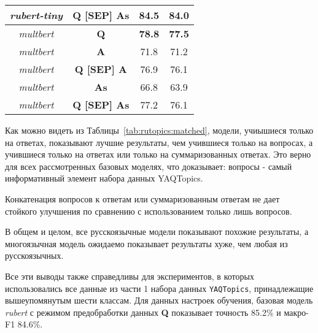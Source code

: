 \begin{table*}
{\begin{tabular}{|c|c||c|c|}
\textit{rubert-tiny} &  \textbf{Q [SEP] As} & \textbf{84.5} & \textbf{84.0}\\ \hline \hline%
\textit{multbert} &  \textbf{Q} & \textbf{78.8} & \textbf{77.5}\\ \hline%
\textit{multbert} &  \textbf{A} & 71.8 & 71.2\\ \hline%
\textit{multbert} &  \textbf{Q [SEP] A} & 76.9 & 76.1\\ \hline%
\textit{multbert} &  \textbf{As} & 66.8 & 63.9\\ \hline%
\textit{multbert} &  \textbf{Q [SEP] As} & 77.2 & 76.1\\ \hline%
\end{tabular}
}
\caption{
 Точность (макро-F1) различных типов базовых моделей на объединенных тестовых данных \texttt{MASSIVE} для русского языка.
Модели были обучены на шестиклассовой \textbf{равноразмерной} подвыборке \texttt{YAQTopics}, предобработанной при помощи одного из нескольких режимов, описанных в Разделе~\ref{rutopics:prepr}. Условные обозначения моделей - как в  Таблице~\ref{tab:rutopics:backbones}. Усреднено по трем запускам.}
\label{tab:rutopics:matched}
\end{table*}

Как можно видеть из Таблицы~\ref{tab:rutopics:matched}, модели, учиышиеся только на ответах, показывают лучшие результаты, чем учившиеся только на вопросах, а учившиеся только на ответах или только на суммаризованных ответах. Это верно для всех рассмотренных базовых моделях, что доказывает: вопросы - самый информативный элемент набора данных {YAQTopics}. 

Конкатенация вопросов к ответам или суммаризованным ответам не дает стойкого улучшения по сравнению с использованием только лишь вопросов. 

В общем и целом, все русскоязычные модели показывают похожие результаты, а многоязычная модель ожидаемо показывает результаты хуже, чем любая из русскоязычных. 

Все эти выводы также справедливы для экспериментов, в которых использовались все данные из части 1 набора данных \texttt{YAQTopics}, принадлежащие вышеупомянутым шести классам. Для данных настроек обучения, базовая модель \textit{rubert} с режимом предобработки данных \textbf{Q} показывает точность 85.2\% и макро-F1 84.6\%.

